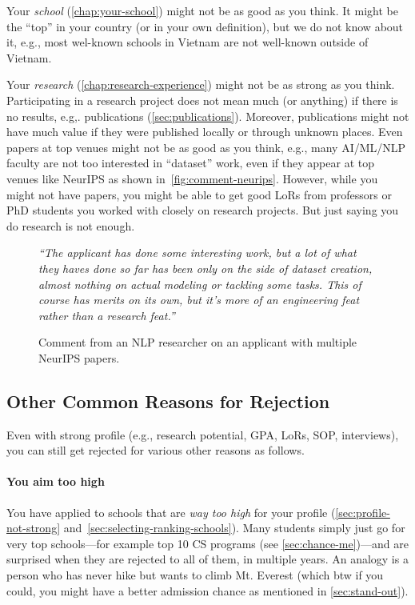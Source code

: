 \documentclass[oneside,11pt]{book}
\newenvironment{examplebox}[1][]{
  \small
  \begin{marker}[\faChessBishop{}]
    {\textbf{#1}}
  }{
  \end{marker}
}
\begin{document}
Your \emph{school} (\autoref{chap:your-school}) might not be as good as you think.  It might be the ``top'' in your country (or in your own definition), but we do not know about it, e.g., most wel-known schools in Vietnam are not well-known outside of Vietnam.

Your \emph{research} (\autoref{chap:research-experience}) might not be as strong as you think.  Participating in a research project does not mean much (or anything) if there is no results, e.g,. publications (\autoref{sec:publications}). Moreover, publications might not have much value if they were published locally or through unknown places.  Even papers at top venues might not be as good as you think, e.g., many AI/ML/NLP faculty are not too interested in ``dataset'' work, even if they appear at top venues like NeurIPS as shown in~\autoref{fig:comment-neurips}.  However, while you might not have papers, you might be able to get good LoRs from professors or PhD students you worked with closely on research projects. But just saying you do research is not enough.

\begin{figure}
    \begin{examplebox}
      \emph{``The applicant has done some interesting work, but a lot of what they haves done so far has been only on the side of dataset creation, almost nothing on actual modeling or tackling some tasks. This of course has merits on its own, but it's more of an engineering feat rather than a research feat.''}\\
    \end{examplebox}
    \caption{Comment from an NLP researcher on an applicant with multiple NeurIPS papers.}\label{fig:comment-neurips}
  \end{figure}


\subsection{Other Common Reasons for Rejection}
Even with strong profile (e.g., research potential, GPA, LoRs, SOP, interviews), you can still get rejected for various other reasons as follows. 

\paragraph{You aim too high} 
You have applied to schools that are \emph{way too high} for your profile (\autoref{sec:profile-not-strong} and~\autoref{sec:selecting-ranking-schools}). Many students simply just go for very top schools---for example top 10 CS programs (see \autoref{sec:chance-me})---and are surprised when they are rejected to all of them, in multiple years. An analogy is a person who has never hike but wants to climb Mt. Everest (which btw if you could, you might have a better admission chance as mentioned in \autoref{sec:stand-out}).
\end{document}
